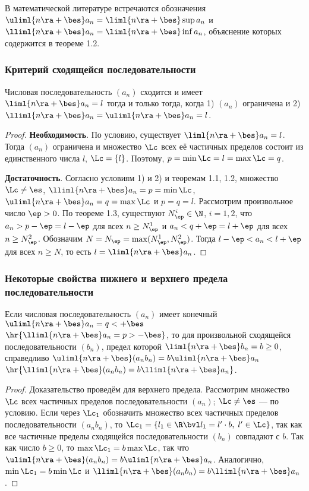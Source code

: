 \documentclass[a4paper]{article}
\begin{document}
В математической литературе встречаются обозначения
$\uliml{n\ra+\bes}a_n = \liml{n\ra+\bes} \sup a_n$ и
$\lliml{n\ra+\bes}a_n = \liml{n\ra+\bes}\inf a_n$, объяснение
которых содержится в теореме 1.2.

\subsubsection{Критерий сходящейся последовательности}

\begin{theorem}
Числовая последовательность $(a_n)$ сходится и имеет
$\liml{n\ra+\bes}a_n=l$ тогда и только тогда, когда 1) $(a_n)$
ограничена и 2) $\lliml{n\ra+\bes}a_n=\uliml{n\ra+\bes}a_n = l$.
\end{theorem}

\begin{proof}
\textbf{Необходимость}. По условию, существует $\liml{n\ra+\bes}
a_n=l$. Тогда $(a_n)$ ограничена и множество $\Lc$ всех её частичных
пределов состоит из единственного числа $l$, $\Lc=\{ l \}$. Поэтому,
$p=\min \Lc = l = \max\Lc = q$.

\textbf{Достаточность}. Согласно условиям 1) и 2) и теоремам 1.1,
1.2, множество $\Lc\ne\es$, $\lliml{n\ra+\bes}a_n = p = \min\Lc$,
$\uliml{n\ra+\bes}a_n = q = \max\Lc$ и $p=q=l$. Рассмотрим
произвольное число $\ep>0$. По теореме 1.3, существуют
$N^i_{\ep}\in\N$, $i=1,2$, что $a_n > p-\ep = l-\ep$ для всех $n\ge
N^1_{\ep}$ и $a_n<q+\ep=l+\ep$ для всех $n\ge N^2_{\ep}$. Обозначим
$N=N_{\ep}=\max (N^1_{\ep},N^2_{\ep})$. Тогда $l-\ep < a_n < l+\ep$
для всех $n\ge N$, то есть $l=\liml{n\ra+\bes} a_n$.
\end{proof}

\subsubsection{Некоторые свойства нижнего и верхнего предела
последовательности}

\begin{theorem}
Если числовая последовательность $(a_n)$ имеет конечный
$\uliml{n\ra+\bes}a_n=q < +\bes$ $\hr{\lliml{n\ra+\bes}a_n=p
>-\bes}$, то для произвольной сходящейся последовательности $(b_n)$,
предел которой $\liml{n\ra+\bes} b_n = b \ge 0$, справедливо
$\uliml{n\ra+\bes} (a_n b_n)=b \uliml{n\ra+\bes}a_n$
$\hr{\lliml{n\ra+\bes}(a_nb_n)=b \lliml{n\ra+\bes}a_n}$.
\end{theorem}

\begin{proof}
Доказательство проведём для верхнего предела. Рассмотрим множество
$\Lc$ всех частичных пределов последовательности $(a_n)$;
$\Lc\ne\es$ --- по условию. Если через $\Lc_1$ обозначить множество
всех частичных пределов последовательности $(a_nb_n)$, то $\Lc_1 =
\{ l_1\in\R \bvl l_1=l'\cdot b, \; l'\in\Lc \}$, так как все
частичные пределы сходящейся последовательности $(b_n)$ совпадают с
$b$. Так как число $b\ge0$, то $\max\Lc_1=b\max\Lc$, так что
$\uliml{n\ra+\bes} (a_nb_n)=b\uliml{n\ra+\bes}a_n$. Аналогично,
$\min\Lc_1=b\min\Lc$ и $\lliml{n\ra+\bes}(a_nb_n)=b
\lliml{n\ra+\bes}a_n$.
\end{proof}
\end{document}
